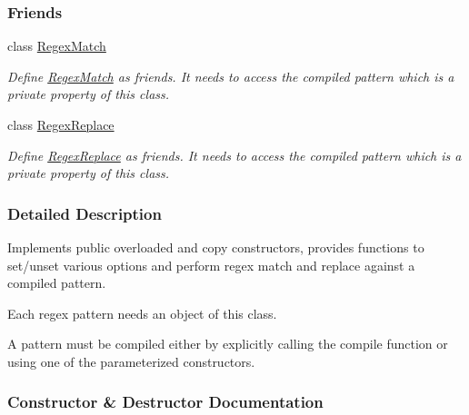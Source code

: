 \subsubsection*{Friends}
\begin{DoxyCompactItemize}
\item 
\hypertarget{classjpcre2_1_1Regex_aaa8d9b93cf5a8b9ebbb78923a1494445}{}\label{classjpcre2_1_1Regex_aaa8d9b93cf5a8b9ebbb78923a1494445} 
class \hyperlink{classjpcre2_1_1Regex_aaa8d9b93cf5a8b9ebbb78923a1494445}{Regex\+Match}
\begin{DoxyCompactList}\small\item\em Define \hyperlink{classjpcre2_1_1RegexMatch}{Regex\+Match} as friends. It needs to access the compiled pattern which is a private property of this class. \end{DoxyCompactList}\item 
\hypertarget{classjpcre2_1_1Regex_a2547cb5380cbe0374ac0d44d34018dbb}{}\label{classjpcre2_1_1Regex_a2547cb5380cbe0374ac0d44d34018dbb} 
class \hyperlink{classjpcre2_1_1Regex_a2547cb5380cbe0374ac0d44d34018dbb}{Regex\+Replace}
\begin{DoxyCompactList}\small\item\em Define \hyperlink{classjpcre2_1_1RegexReplace}{Regex\+Replace} as friends. It needs to access the compiled pattern which is a private property of this class. \end{DoxyCompactList}\end{DoxyCompactItemize}


\subsubsection{Detailed Description}
Implements public overloaded and copy constructors, provides functions to set/unset various options and perform regex match and replace against a compiled pattern. 

Each regex pattern needs an object of this class.

A pattern must be compiled either by explicitly calling the compile function or using one of the parameterized constructors. 

\subsubsection{Constructor \& Destructor Documentation}
\hypertarget{classjpcre2_1_1Regex_a302f65cd5747c5d34570ca76516ab715_a302f65cd5747c5d34570ca76516ab715}{}\label{classjpcre2_1_1Regex_a302f65cd5747c5d34570ca76516ab715_a302f65cd5747c5d34570ca76516ab715} 
